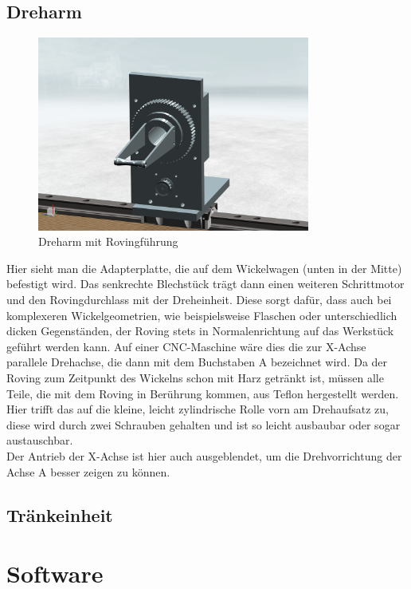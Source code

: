\documentclass[paper=A4,pagesize,DIV=18, 12pt,listof=totoc,bibliography=totoc,headings=optiontohead,open=any]{article}
\begin{document}
\subsection{Dreharm}
\begin{figure}[H]
	\centering
	\includegraphics[width=0.8\textwidth]{NX_Screenshots/arm_vorne.png}
	\caption{Dreharm mit Rovingführung} 
	\label{fig:dreharm}
\end{figure}
Hier sieht man die Adapterplatte, die auf dem Wickelwagen (unten in der Mitte) befestigt wird. Das senkrechte Blechstück trägt dann einen weiteren Schrittmotor und den Rovingdurchlass mit der Dreheinheit. Diese sorgt dafür, dass auch bei komplexeren Wickelgeometrien, wie beispielsweise Flaschen oder unterschiedlich dicken Gegenständen, der Roving stets in Normalenrichtung auf das Werkstück geführt werden kann. Auf einer CNC-Maschine wäre dies die zur X-Achse parallele Drehachse, die dann mit dem Buchstaben A bezeichnet wird. Da der Roving zum Zeitpunkt des Wickelns schon mit Harz getränkt ist, müssen alle Teile, die mit dem Roving in Berührung kommen, aus Teflon hergestellt werden. Hier trifft das auf die kleine, leicht zylindrische Rolle vorn am Drehaufsatz zu, diese wird durch zwei Schrauben gehalten und ist so leicht ausbaubar oder sogar austauschbar.\\
Der Antrieb der X-Achse ist hier auch ausgeblendet, um die Drehvorrichtung der Achse A besser zeigen zu können.


\subsection{Tränkeinheit}



\section{Software}
\end{document}
